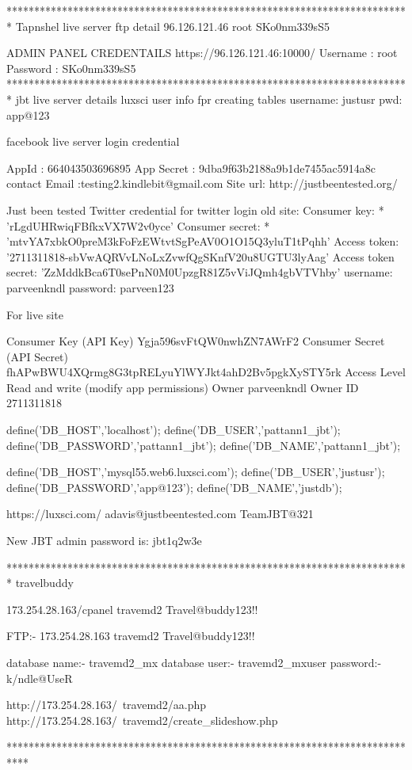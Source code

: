 *************************************************************************
Tapnshel live server ftp detail
96.126.121.46
root
SKo0nm339sS5

ADMIN PANEL CREDENTAILS
https://96.126.121.46:10000/
Username : root
Password : SKo0nm339sS5
*************************************************************************
jbt live server details
luxsci user info fpr creating tables
username: justusr
pwd: app@123


facebook live server login credential

AppId : 664043503696895
App Secret : 9dba9f63b2188a9b1de7455ac5914a8c
contact Email :testing2.kindlebit@gmail.com
Site url: http://justbeentested.org/

Just been tested
Twitter credential for twitter login
old site: 
Consumer key: * 'rLgdUHRwiqFBfkxVX7W2v0yce'
Consumer secret: * 'mtvYA7xbkO0preM3kFoFzEWtvtSgPeAV0O1O15Q3yluT1tPqhh'
Access token: '2711311818-sbVwAQRVvLNoLxZvwfQgSKnfV20u8UGTU3lyAag'
Access token secret: 'ZzMddkBca6T0sePnN0M0UpzgR81Z5vViJQmh4gbVTVhby'
 username: parveenkndl
 password: parveen123

 For live site
 
Consumer Key (API Key) Ygja596svFtQW0nwhZN7AWrF2
Consumer Secret (API Secret) fhAPwBWU4XQrmg8G3tpRELyuYlWYJkt4ahD2Bv5pgkXySTY5rk
Access Level Read and write (modify app permissions)
Owner parveenkndl
Owner ID 2711311818 
 

define('DB_HOST','localhost');
define('DB_USER','pattann1_jbt');
define('DB_PASSWORD','pattann1_jbt');
define('DB_NAME','pattann1_jbt');

define('DB_HOST','mysql55.web6.luxsci.com');
define('DB_USER','justusr');
define('DB_PASSWORD','app@123');
define('DB_NAME','justdb');

https://luxsci.com/
adavis@justbeentested.com
TeamJBT@321

New JBT admin password is: jbt1q2w3e

*************************************************************************
travelbuddy

173.254.28.163/cpanel
travemd2
Travel@buddy123!!

FTP:- 
173.254.28.163
travemd2
Travel@buddy123!!

database name:- travemd2_mx
database user:- travemd2_mxuser
password:- k/ndle@UseR

http://173.254.28.163/~travemd2/aa.php
http://173.254.28.163/~travemd2/create_slideshow.php

****************************************************************************

